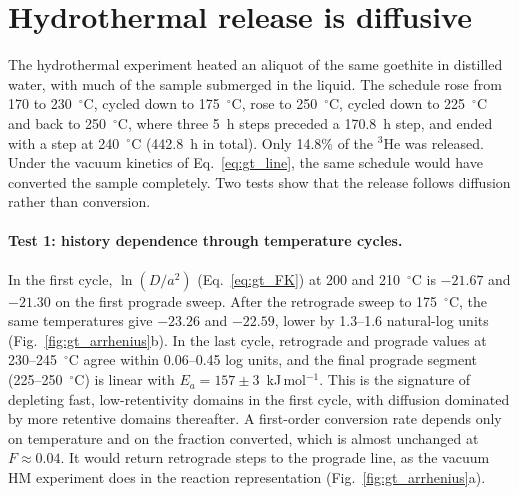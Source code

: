 \section{Hydrothermal release is diffusive}
\label{sec:gt_hydro}

The hydrothermal experiment heated an aliquot of the same goethite in distilled water, with
much of the sample submerged in the liquid. The schedule rose from 170 to 230~$^\circ$C, cycled
down to 175~$^\circ$C, rose to 250~$^\circ$C, cycled down to 225~$^\circ$C and back to 250~$^\circ$C,
where three 5~h steps preceded a 170.8~h step, and ended with a step at 240~$^\circ$C (442.8~h in
total). Only 14.8\% of the $^3$He was released. Under the vacuum kinetics of
Eq.~\ref{eq:gt_line}, the same schedule would have converted the sample completely. Two tests
show that the release follows diffusion rather than conversion.

\paragraph{Test 1: history dependence through temperature cycles.} In the first cycle,
$\ln(D/a^2)$ (Eq.~\ref{eq:gt_FK}) at 200 and 210~$^\circ$C is $-21.67$ and $-21.30$ on the first
prograde sweep. After the retrograde sweep to 175~$^\circ$C, the same temperatures give $-23.26$
and $-22.59$, lower by 1.3--1.6 natural-log units (Fig.~\ref{fig:gt_arrhenius}b). In the last
cycle, retrograde and prograde values at 230--245~$^\circ$C agree within 0.06--0.45 log units, and
the final prograde segment (225--250~$^\circ$C) is linear with $E_a = 157\pm3$~kJ\,mol$^{-1}$. This
is the signature of depleting fast, low-retentivity domains in the first cycle, with diffusion
dominated by more retentive domains thereafter. A first-order conversion rate depends only on
temperature and on the fraction converted, which is almost unchanged at $F\approx0.04$. It would
return retrograde steps to the prograde line, as the vacuum HM experiment does in the reaction
representation (Fig.~\ref{fig:gt_arrhenius}a).

